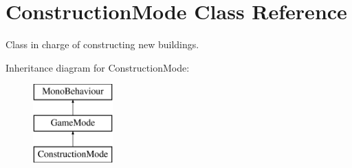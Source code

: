 \hypertarget{class_construction_mode}{}\section{Construction\+Mode Class Reference}
\label{class_construction_mode}


Class in charge of constructing new buildings.  


Inheritance diagram for Construction\+Mode\+:\begin{figure}[H]
\begin{center}
\leavevmode
\includegraphics[height=3.000000cm]{class_construction_mode}
\end{center}
\end{figure}
